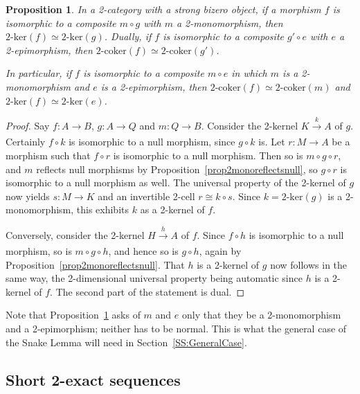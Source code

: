 \documentclass[reqno,a4paper]{amsart}
\numberwithin{equation}{section}
\theoremstyle{plain}
\newtheorem{proposition}[subsection]{Proposition}
\theoremstyle{definition}
\def\nameit#1{\textrm{#1}~}
\def\prox{\nameit{Proposition}}
\newcommand{\comp}{\circ}
\newcommand{\iso}{\cong}
\renewcommand{\1}{\onecat{1}}
\newcommand{\twoker}{\ensuremath{2\text{-}\mathrm{ker}}}
\newcommand{\twocoker}{\ensuremath{2\text{-}\mathrm{coker}}}
\newcommand{\aar}[2][]{\xrightarrow[#1]{#2}}
\begin{document}
\begin{proposition}\label{CoKernel of Composite}
	In a 2-category with a strong bizero object, if a morphism \(f\) is isomorphic to a composite \(m\comp g\) with \(m\) a 2-monomorphism, then \(\twoker(f)\simeq\twoker(g)\). Dually, if \(f\) is isomorphic to a composite \(g'\comp e\) with \(e\) a 2-epimorphism, then \(\twocoker(f)\simeq\twocoker(g')\).

	In particular, if \(f\) is isomorphic to a composite \(m\comp e\) in which \(m\) is a 2-monomorphism and \(e\) is a 2-epimorphism, then \(\twocoker(f)\simeq\twocoker(m)\) and \(\twoker(f)\simeq\twoker(e)\).
\end{proposition}
\begin{proof}
	Say \(f\colon A\to B\), \(g\colon A\to Q\) and \(m\colon Q\to B\). Consider the 2-kernel \(K\aar{k}A\) of \(g\). Certainly \(f\comp k\) is isomorphic to a null morphism, since \(g\comp k\) is. Let \(r\colon M\to A\) be a morphism such that \(f\comp r\) is isomorphic to a null morphism. Then so is \(m\comp g\comp r\), and \(m\) reflects null morphisms by \prox\ref{prop2monoreflectsnull}, so \(g\comp r\) is isomorphic to a null morphism as well. The universal property of the 2-kernel of \(g\) now yields \(s\colon M\to K\) and an invertible 2-cell \(r\iso k\comp s\). Since \(k=\twoker(g)\) is a 2-monomorphism, this exhibits \(k\) as a 2-kernel of \(f\).

	Conversely, consider the 2-kernel \(H\aar{h}A\) of \(f\). Since \(f\comp h\) is isomorphic to a null morphism, so is \(m\comp g\comp h\), and hence so is \(g\comp h\), again by \prox\ref{prop2monoreflectsnull}. That \(h\) is a 2-kernel of \(g\) now follows in the same way, the 2-dimensional universal property being automatic since \(h\) is a 2-kernel of \(f\). The second part of the statement is dual.
\end{proof}

Note that \prox\ref{CoKernel of Composite} asks of \(m\) and \(e\) only that they be a 2-monomorphism and a 2-epimorphism; neither has to be normal. This is what the general case of the Snake Lemma will need in Section~\ref{SS:GeneralCase}.

\subsection{Short 2-exact sequences}\label{SS:SES}
\end{document}
